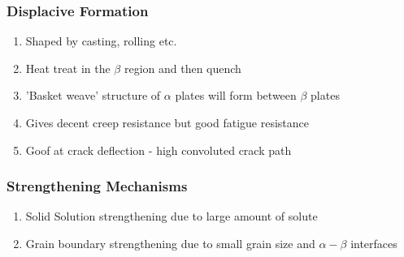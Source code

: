
\subsubsection{Displacive Formation} %
\label{ssub:displacive_formation}

\begin{enumerate}
  \item Shaped by casting, rolling etc.
  \item Heat treat in the $\beta$ region and then quench
  \item 'Basket weave' structure of $\alpha$ plates will form between $\beta$ plates
  \item Gives decent creep resistance but good fatigue resistance
  \item Goof at crack deflection - high convoluted crack path
\end{enumerate}


\subsubsection{Strengthening Mechanisms} %
\label{ssub:strengthening_mechanisms}

\begin{enumerate}
  \item Solid Solution strengthening due to large amount of solute
  \item Grain boundary strengthening due to small grain size and $\alpha-\beta$ interfaces
\end{enumerate}




